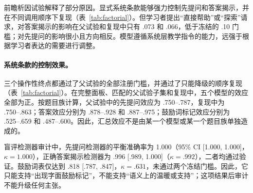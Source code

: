 \documentclass[11pt,a4paper,UTF8]{ctexart}
\begin{document}
前瞻析因试验解释了部分原因。显式系统条款能够强力控制先提问和答案揭示，并在不同调用顺序下复现（表~\ref{tab:factorial}）。但学习者提出“直接帮助”或“探索”请求，对答案揭示的影响在父试验和复现中只有 .073 和 .066，低于冻结的 .10 门槛；对先提问的影响很小且方向相反。模型遵循系统层教学指令的能力，远强于根据学习者表达的需要进行调整。

\paragraph{系统条款的控制效果。}

三个操作性终点都通过了父试验的全部注册门槛，并通过了只能降级的顺序复现（表~\ref{tab:factorial}）。在完整面板、匹配的父试验子集和复现中，五个模型的效应全部为正。按题目族计算，父试验中的先提问效应为 .750--.787，复现中为 .750--.863；答案效应分别为 .878--.928 和 .887--.975；鼓励词标记效应分别为 .525--.659 和 .487--.600。因此，汇总效应不是由某一个模型或某一个题目族单独造成的。

\begin{table}[t]
  \centering
  \scriptsize
  \caption{前瞻冻结的成分效应。“选择性”是目标效应除以最大主要交叉效应的绝对值；注册阈值为 2.0。最后一列还要求每个模型在匹配的父试验子集和独立排序的复现中都呈正效应。}
  \label{tab:factorial}
\end{table}

盲评检测器审计中，先提问检测器的平衡准确率为 1.000（95\% CI [1.000, 1.000]，$\kappa=1.000$），正确答案揭示检测器为 .996 [.989, 1.000]（$\kappa=.992$），二者均通过验证。鼓励词表仅达到 .818 [.787, .847]，$\kappa=.631$，未通过两个冻结门槛。因此，它只能支持“出现字面鼓励标记”，不能支持“语义上的温暖或支持”；这项结果后审计不能升级任何主张。
\end{document}
